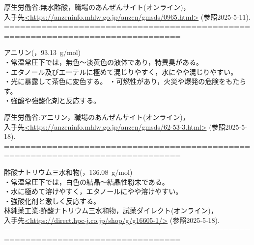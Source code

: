   厚生労働省:無水酢酸，職場のあんぜんサイト(オンライン)，\\
             入手先\url{<https://anzeninfo.mhlw.go.jp/anzen/gmsds/0965.html>}
             (参照2025-5-11).
===============================================================================
\item アニリン(，93.13\ g/mol)\cite{d}\\
    \hspace{0pt}・常温常圧下では，無色～淡黄色の液体であり，特異臭がある。\\
    \hspace{0pt}・エタノール及びエーテルに極めて混じりやすく，水にやや混じりやすい。\\
    \hspace{0pt}・光に暴露して茶色に変色する。
    \hspace{0pt}・可燃性があり，火災や爆発の危険をもたらす。\\
    \hspace{0pt}・強酸や強酸化剤と反応する。\\

\begin{minipage}[b]{0.30\textwidth}
    \centering
    \caption{アニリン}
    \label{fig:C6H5NH2}
\end{minipage}

  厚生労働省:アニリン，職場のあんぜんサイト(オンライン)，\\
             入手先\url{<https://anzeninfo.mhlw.go.jp/anzen/gmsds/62-53-3.html>}
             (参照2025-5-18).
===============================================================================
\item 酢酸ナトリウム三水和物(，136.08\ g/mol)\cite{d}\\
    \hspace{0pt}・常温常圧下では，白色の結晶〜結晶性粉末である。\\
    \hspace{0pt}・水に極めて溶けやすく，エタノールにやや溶けやすい。\\
    \hspace{0pt}・強酸化剤と激しく反応する。\\

  林純薬工業:酢酸ナトリウム三水和物，試薬ダイレクト(オンライン)，\\
             入手先\url{<https://direct.hpc-j.co.jp/shop/g/g16605-1/>}
             (参照2025-5-18).
===============================================================================




